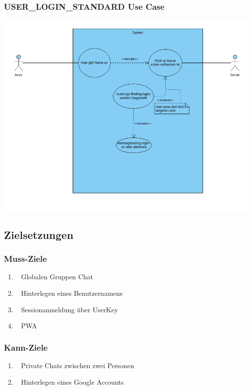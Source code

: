 \documentclass[12pt]{article}
\begin{document}
      \subsubsection{USER\_LOGIN\_STANDARD Use Case}
        \includegraphics[width=\textwidth]{useCase_USER_LOGIN_STANDARD.png}

    \subsection{Zielsetzungen}
      \subsubsection{Muss-Ziele}
        \begin{enumerate}
          \item \faGlobe~ Globalen Gruppen Chat
          \item \faUser~ Hinterlegen eines Benutzernamens
          \item \faKey~ Sessionanmeldung über UserKey
          \item \faMobile~ PWA
        \end{enumerate}

      \subsubsection{Kann-Ziele}
        \begin{enumerate}
          \item \faUsers~ Private Chats zwischen zwei Personen
          \item \faGoogle~ Hinterlegen eines Google Accounts
        \end{enumerate}
\end{document}
